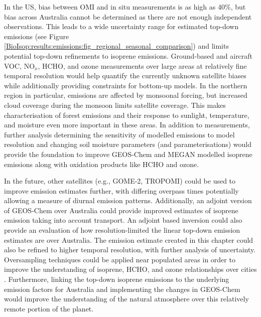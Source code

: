   In the US, bias between OMI and in situ measurements is as high as 40\%, but 
  bias across Australia cannot be determined as there are not enough independent observations.
  This leads to a wide uncertainty range for estimated top-down emissions (see Figure \ref{BioIsop:results:emissions:fig_regional_seasonal_comparison}) and limits potential top-down refinements to isoprene emissions.
  Ground-based and aircraft VOC, NO$_x$, HCHO, and ozone measurements over large areas at relatively fine temporal resolution would help quantify the currently unknown satellite biases while additionally providing constraints for bottom-up models.
  In the northern region in particular, emissions are affected by monsoonal forcing, but increased cloud coverage during the monsoon limits satellite coverage. 
  This makes characterisation of forest emissions and their response to sunlight, temperature, and moisture even more important in these areas.
  In addition to measurements, further analysis determining the sensitivity of modelled emissions to model resolution and changing soil moisture parameters (and parameterisations) would provide the foundation to improve GEOS-Chem and MEGAN modelled isoprene emissions along with oxidation products like HCHO and ozone.
  
  In the future, other satellites (e.g., GOME-2, TROPOMI) could be used to improve emission estimates further, with differing overpass times potentially allowing a measure of diurnal emission patterns.
  Additionally, an adjoint version of GEOS-Chem over Australia could provide improved estimates of isoprene emission taking into account transport.
  An adjoint based inversion could also provide an evaluation of how resolution-limited the linear top-down emission estimates are over Australia.
  The emission estimate created in this chapter could also be refined to higher temporal resolution, with further analysis of uncertainty.
  Oversampling techniques could be applied near populated areas in order to improve the understanding of isoprene, HCHO, and ozone relationships over cities \parencite[e.g.,][]{Surl2018}.
  Furthermore, linking the top-down isoprene emissions to the underlying emission factors for Australia and implementing the changes in GEOS-Chem would improve the understanding of the natural atmosphere over this relatively remote portion of the planet. %

%  
  